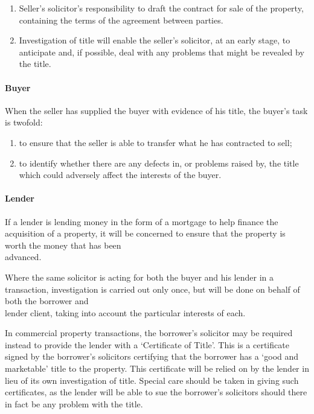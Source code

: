 \documentclass[
]{article}
\providecommand{\tightlist}{%
  \setlength{\itemsep}{0pt}\setlength{\parskip}{0pt}}
\begin{document}
\begin{enumerate}
\tightlist
\item
  Seller's solicitor's responsibility to draft the contract for sale of
  the property, containing the terms of the agreement between parties.
\item
  Investigation of title will enable the seller's solicitor, at an early
  stage, to anticipate and, if possible, deal with any problems that
  might be revealed by the title.
\end{enumerate}

\hypertarget{buyer}{%
\paragraph{Buyer}\label{buyer}}

When the seller has supplied the buyer with evidence of his title, the
buyer's task is twofold:

\begin{enumerate}
\tightlist
\item
  to ensure that the seller is able to transfer what he has contracted
  to sell;
\item
  to identify whether there are any defects in, or problems raised by,
  the title which could adversely affect the interests of the buyer.
\end{enumerate}

\hypertarget{lender}{%
\paragraph{Lender}\label{lender}}

If a lender is lending money in the form of a mortgage to help finance
the acquisition of a property, it will be concerned to ensure that the
property is worth the money that has been\\
advanced.

Where the same solicitor is acting for both the buyer and his lender in
a transaction, investigation is carried out only once, but will be done
on behalf of both the borrower and\\
lender client, taking into account the particular interests of each.

In commercial property transactions, the borrower's solicitor may be
required instead to provide the lender with a `Certificate of Title'.
This is a certificate signed by the borrower's solicitors certifying
that the borrower has a `good and marketable' title to the property.
This certificate will be relied on by the lender in lieu of its own
investigation of title. Special care should be taken in giving such
certificates, as the lender will be able to sue the borrower's
solicitors should there in fact be any problem with the title.
\end{document}
